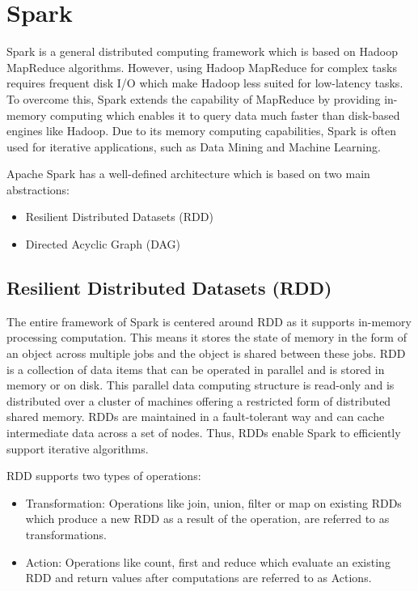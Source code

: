 \documentclass[sigconf]{acmart}
\begin{document}
\section{Spark}

Spark is a general distributed computing framework which is based on Hadoop MapReduce algorithms\cite{fu2016spark_p1}. However, using Hadoop MapReduce for complex tasks requires frequent disk I/O which make Hadoop less suited for low-latency tasks. To overcome this, Spark extends the capability of MapReduce by providing in-memory computing which enables it to query data much faster than disk-based engines like Hadoop\cite{spark_j1}. Due to its memory computing capabilities, Spark is often used for iterative applications, such as Data Mining and Machine Learning\cite{fu2016spark_p1}. 

Apache Spark has a well-defined architecture which is based on two main abstractions\cite{spark_a2}:
\begin{itemize}
	\item Resilient Distributed Datasets (RDD)
	\item Directed Acyclic Graph (DAG)
\end{itemize}

\subsection{Resilient Distributed Datasets (RDD)} 
The entire framework of Spark is centered around RDD as it supports in-memory processing computation. This means it stores the state of memory in the form of an object across multiple jobs and the object is shared between these jobs\cite{spark_j2}. RDD is a collection of data items that can be operated in parallel and is stored in memory or on disk. This parallel data computing structure is read-only and is distributed over a cluster of machines offering a restricted form of distributed shared memory. RDDs are maintained in a fault-tolerant way and can cache intermediate data across a set of nodes. Thus, RDDs enable Spark to efficiently support iterative algorithms\cite{marcu2016spark_p2}.

RDD supports two types of operations\cite{spark_a3}:
\begin{itemize}
	\item Transformation: Operations like join, union, filter or map on existing RDDs which produce a new RDD as a result of the operation, are referred to as transformations.
	\item Action: Operations like count, first and reduce which evaluate an existing RDD and return values after computations are referred to as Actions.
\end{itemize}
\end{document}

